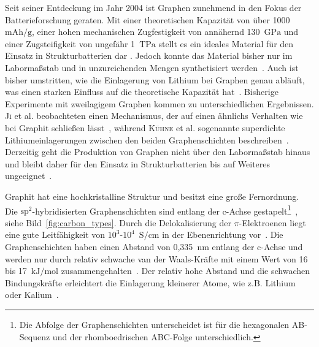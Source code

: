 Seit seiner Entdeckung im Jahr 2004 \cite{Novoselov2004} ist Graphen zunehmend in den Fokus der Batterieforschung geraten. Mit einer theoretischen Kapazität von über 1000~$\si{\mA \hour \per \g}$, einer hohen mechanischen Zugfestigkeit von annähernd 130~$\si{\GPa}$ und einer Zugsteifigkeit von ungefähr 1~$\si{\tera \Pa}$ stellt es ein ideales Material für den Einsatz in Strukturbatterien dar \cite{Novoselov2012}. Jedoch konnte das Material bisher nur im Labormaßstab und in unzureichenden Mengen synthetisiert werden~\cite{Shams2015}. Auch ist bisher umstritten, wie die Einlagerung von Lithium bei Graphen genau abläuft, was einen starken Einfluss auf die theoretische Kapazität hat~\cite{Safie2023, Singh2024}. Bisherige Experimente mit zweilagigem Graphen kommen zu unterschiedlichen Ergebnissen. \textsc{Ji} et al. beobachteten einen Mechanismus, der auf einen ähnlichs Verhalten wie bei Graphit schließen lässt~\cite{Ji2019}, während \textsc{Kühne} et al. sogenannte superdichte Lithiumeinlagerungen zwischen den beiden Graphenschichten beschreiben~\cite{Kuehne2017}. Derzeitig geht die Produktion von Graphen nicht über den Labormaßstab hinaus und bleibt daher für den Einsatz in Strukturbatterien bis auf Weiteres ungeeignet~\cite{Zhu2014, Singh2024}.

Graphit hat eine hochkristalline Struktur und besitzt eine große Fernordnung. Die $\text{sp}^\text{2}$-hybridisierten Graphenschichten sind entlang der c-Achse gestapelt\footnote{Die Abfolge der Graphenschichten unterscheidet ist für die hexagonalen AB-Sequenz und der rhomboedrischen ABC-Folge unterschiedlich.}~\cite{Inagaki2014}, siehe Bild~\ref{fig:carbon_types}. Durch die Delokalisierung der $\pi$-Elektroenen liegt  eine gute Leitfähigkeit von $10^3$-$10^4$~$\si{\siemens \per \cm}$ in der Ebenenrichtung vor~\cite{Dutta1953}. Die Graphenschichten haben einen Abstand von 0,335~$\si{\nano\meter}$ entlang der c-Achse und werden nur durch relativ schwache van der Waals-Kräfte mit einem Wert von 16 bis 17~$\si{\kJ \per \mol}$ zusammengehalten~\cite{Xu2012}. Der relativ hohe Abstand und die schwachen Bindungskräfte erleichtert die Einlagerung kleinerer Atome, wie z.B. Lithium oder Kalium~\cite{Wang2021}.

